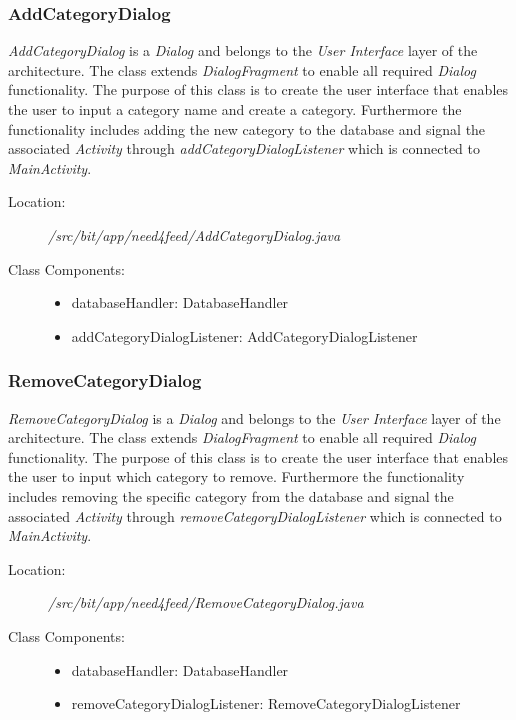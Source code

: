 \subsubsection{AddCategoryDialog}
\textit{AddCategoryDialog} is a \textit{Dialog} and belongs to the \textit{User Interface} layer of the architecture. The class extends \textit{DialogFragment} to enable all required \textit{Dialog} functionality. The purpose of this class is to create the user interface that enables the user to input a category name and create a category. Furthermore the functionality includes adding the new category to the database and signal the associated \textit{Activity} through \textit{addCategoryDialogListener} which is connected to \textit{MainActivity}.
\begin{description}
  \item[Location:] \textit{/src/bit/app/need4feed/AddCategoryDialog.java} \hfill
  \item[Class Components:] \hfill
     \begin{itemize}
        \item databaseHandler: DatabaseHandler
        \item addCategoryDialogListener: AddCategoryDialogListener
     \end{itemize}
\end{description}


\subsubsection{RemoveCategoryDialog}
\textit{RemoveCategoryDialog} is a \textit{Dialog} and belongs to the \textit{User Interface} layer of the architecture. The class extends \textit{DialogFragment} to enable all required \textit{Dialog} functionality. The purpose of this class is to create the user interface that enables the user to input which category to remove. Furthermore the functionality includes removing the specific category from the database and signal the associated \textit{Activity} through \textit{removeCategoryDialogListener} which is connected to \textit{MainActivity}.
\begin{description}
  \item[Location:] \textit{/src/bit/app/need4feed/RemoveCategoryDialog.java} \hfill
  \item[Class Components:] \hfill
     \begin{itemize}
        \item databaseHandler: DatabaseHandler
        \item removeCategoryDialogListener: RemoveCategoryDialogListener
     \end{itemize}
\end{description}


